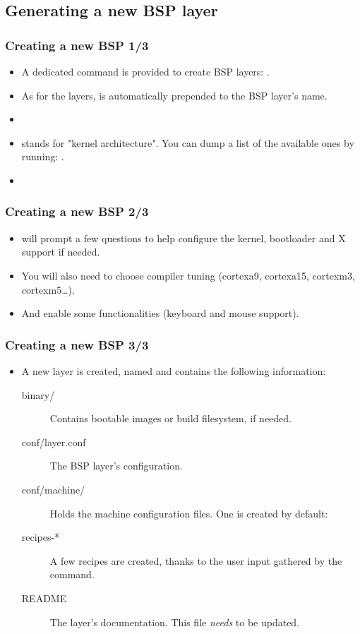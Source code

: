 \subsection{Generating a new BSP layer}

\begin{frame}
  \frametitle{Creating a new BSP 1/3}
  \begin{itemize}
    \item A dedicated command is provided to create BSP layers:
      .
    \item As for the layers,  is automatically prepended
      to the BSP layer's name.
    \item {}
    \item {} stands for "kernel architecture". You can dump
      a list of the available ones by running: .
    \item {}
  \end{itemize}
\end{frame}

\begin{frame}
  \frametitle{Creating a new BSP 2/3}
  \begin{itemize}
    \item {} will prompt a few questions to help
      configure the kernel, bootloader and X support if needed.
    \item You will also need to choose compiler tuning (cortexa9,
      cortexa15, cortexm3, cortexm5\dots).
    \item And enable some functionalities (keyboard and mouse
      support).
  \end{itemize}
\end{frame}

\begin{frame}
  \frametitle{Creating a new BSP 3/3}
  \begin{itemize}
    \item A new layer is created, named  and
      contains the following information:
      \begin{description}
        \item[binary/] Contains bootable images or build filesystem,
          if needed.
        \item[conf/layer.conf] The BSP layer's configuration.
        \item[conf/machine/] Holds the machine configuration files.
          One is created by default: 
        \item[recipes-*] A few recipes are created, thanks to the user
          input gathered by the  command.
        \item[README] The layer's documentation. This file
          \emph{needs} to be updated.
      \end{description}
  \end{itemize}
\end{frame}

